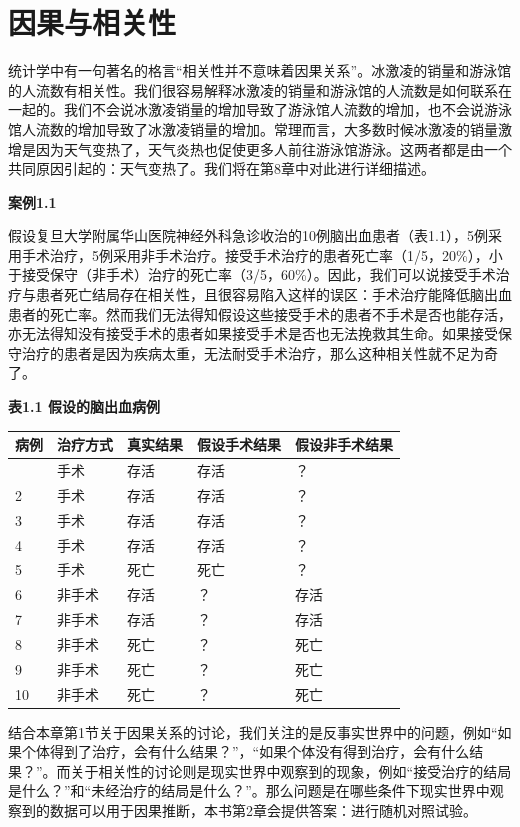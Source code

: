\documentclass[
  chinese-hans,
  letterpaper,
  DIV=11,
  numbers=noendperiod]{scrreprt}
\newcounter{none} %
\begin{document}
\section{因果与相关性}\label{ux56e0ux679cux4e0eux76f8ux5173ux6027}

统计学中有一句著名的格言``相关性并不意味着因果关系''。冰激凌的销量和游泳馆的人流数有相关性。我们很容易解释冰激凌的销量和游泳馆的人流数是如何联系在一起的。我们不会说冰激凌销量的增加导致了游泳馆人流数的增加，也不会说游泳馆人流数的增加导致了冰激凌销量的增加。常理而言，大多数时候冰激凌的销量激增是因为天气变热了，天气炎热也促使更多人前往游泳馆游泳。这两者都是由一个共同原因引起的：天气变热了。我们将在第8章中对此进行详细描述。

\textbf{案例1.1}

假设复旦大学附属华山医院神经外科急诊收治的10例脑出血患者（表1.1），5例采用手术治疗，5例采用非手术治疗。接受手术治疗的患者死亡率（1/5，20\%），小于接受保守（非手术）治疗的死亡率（3/5，60\%）。因此，我们可以说接受手术治疗与患者死亡结局存在相关性，且很容易陷入这样的误区：手术治疗能降低脑出血患者的死亡率。然而我们无法得知假设这些接受手术的患者不手术是否也能存活，亦无法得知没有接受手术的患者如果接受手术是否也无法挽救其生命。如果接受保守治疗的患者是因为疾病太重，无法耐受手术治疗，那么这种相关性就不足为奇了。

\textbf{表1.1 假设的脑出血病例}

{\def\LTcaptype{none} %
\begin{longtable}[]{@{}lllll@{}}
\toprule\noalign{}
病例 & 治疗方式 & 真实结果 & 假设手术结果 & 假设非手术结果 \\
\midrule\noalign{}
\endhead
\bottomrule\noalign{}
\endlastfoot
1 & 手术 & 存活 & 存活 & ？ \\
2 & 手术 & 存活 & 存活 & ？ \\
3 & 手术 & 存活 & 存活 & ？ \\
4 & 手术 & 存活 & 存活 & ？ \\
5 & 手术 & 死亡 & 死亡 & ？ \\
6 & 非手术 & 存活 & ？ & 存活 \\
7 & 非手术 & 存活 & ？ & 存活 \\
8 & 非手术 & 死亡 & ？ & 死亡 \\
9 & 非手术 & 死亡 & ？ & 死亡 \\
10 & 非手术 & 死亡 & ？ & 死亡 \\
\end{longtable}
}

结合本章第1节关于因果关系的讨论，我们关注的是反事实世界中的问题，例如``如果个体得到了治疗，会有什么结果？''，``如果个体没有得到治疗，会有什么结果？''。而关于相关性的讨论则是现实世界中观察到的现象，例如``接受治疗的结局是什么？''和``未经治疗的结局是什么？''。那么问题是在哪些条件下现实世界中观察到的数据可以用于因果推断，本书第2章会提供答案：进行随机对照试验。
\end{document}
